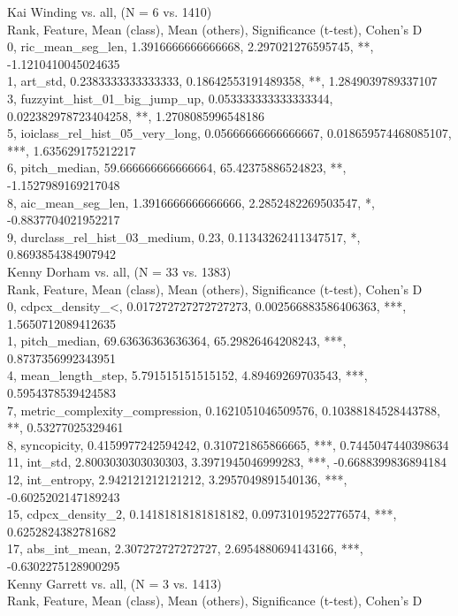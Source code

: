 Kai Winding vs. all, (N = 6 vs. 1410)\\
Rank, Feature, Mean (class), Mean (others), Significance (t-test), Cohen's D\\
0, ric_mean_seg_len, 1.3916666666666668, 2.297021276595745, **, -1.1210410045024635\\
1, art_std, 0.2383333333333333, 0.18642553191489358, **, 1.2849039789337107\\
3, fuzzyint_hist_01_big_jump_up, 0.053333333333333344, 0.022382978723404258, **, 1.2708085996548186\\
5, ioiclass_rel_hist_05_very_long, 0.05666666666666667, 0.018659574468085107, ***, 1.635629175212217\\
6, pitch_median, 59.666666666666664, 65.42375886524823, **, -1.1527989169217048\\
8, aic_mean_seg_len, 1.3916666666666666, 2.2852482269503547, *, -0.8837704021952217\\
9, durclass_rel_hist_03_medium, 0.23, 0.11343262411347517, *, 0.8693854384907942\\
Kenny Dorham vs. all, (N = 33 vs. 1383)\\
Rank, Feature, Mean (class), Mean (others), Significance (t-test), Cohen's D\\
0, cdpcx_density_<, 0.017272727272727273, 0.002566883586406363, ***, 1.5650712089412635\\
1, pitch_median, 69.63636363636364, 65.29826464208243, ***, 0.8737356992343951\\
4, mean_length_step, 5.791515151515152, 4.89469269703543, ***, 0.5954378539424583\\
7, metric_complexity_compression, 0.1621051046509576, 0.10388184528443788, **, 0.53277025329461\\
8, syncopicity, 0.4159977242594242, 0.310721865866665, ***, 0.7445047440398634\\
11, int_std, 2.8003030303030303, 3.3971945046999283, ***, -0.6688399836894184\\
12, int_entropy, 2.942121212121212, 3.2957049891540136, ***, -0.6025202147189243\\
15, cdpcx_density_2, 0.14181818181818182, 0.09731019522776574, ***, 0.6252824382781682\\
17, abs_int_mean, 2.307272727272727, 2.6954880694143166, ***, -0.6302275128900295\\
Kenny Garrett vs. all, (N = 3 vs. 1413)\\
Rank, Feature, Mean (class), Mean (others), Significance (t-test), Cohen's D\\
